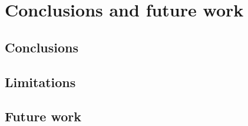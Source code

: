 \chapter{Conclusions and future work}
\label{chap:conc}

\section{Conclusions}

\section{Limitations}

\section{Future work}
